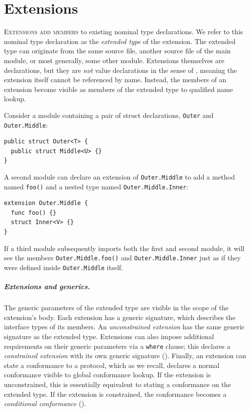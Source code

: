 \documentclass[../generics]{subfiles}
\begin{document}
\chapter{Extensions}\label{chap:extensions}

\lettrine{E}{xtensions add members} to existing nominal type declarations. We refer to this nominal type declaration as the \emph{extended type} of the extension. The extended type can originate from the same source file, another source file of the main module, or most generally, some other module. Extensions themselves are declarations, but they are \emph{not} value declarations in the sense of , meaning the extension itself cannot be referenced by name. Instead, the members of an extension become visible as members of the extended type to qualified name lookup.

Consider a module containing a pair of struct declarations, \texttt{Outer} and \texttt{Outer.Middle}:
\begin{Verbatim}
public struct Outer<T> {
  public struct Middle<U> {}
}
\end{Verbatim}
A second module can declare an extension of \texttt{Outer.Middle} to add a method named \texttt{foo()} and a nested type named \texttt{Outer.Middle.Inner}:
\begin{Verbatim}
extension Outer.Middle {
  func foo() {}
  struct Inner<V> {}
}
\end{Verbatim}
If a third module subsequently imports both the first and second module, it will see the members \texttt{Outer.Middle.foo()} and \texttt{Outer.Middle.Inner} just as if they were defined inside \texttt{Outer.Middle} itself.

\paragraph{Extensions and generics.}
The generic parameters of the extended type are visible in the scope of the extension's body. Each extension has a generic signature, which describes the interface types of its members. An \emph{unconstrained extension} has the same generic signature as the extended type. Extensions can also impose additional requirements on their generic parameters via a \texttt{where} clause; this declares a \emph{constrained extension} with its own generic signature (). Finally, an extension can state a conformance to a protocol, which as we recall, declares a normal conformance visible to global conformance lookup. If the extension is unconstrained, this is essentially equivalent to stating a conformance on the extended type. If the extension is constrained, the conformance becomes a \emph{conditional conformance} ().
\end{document}
